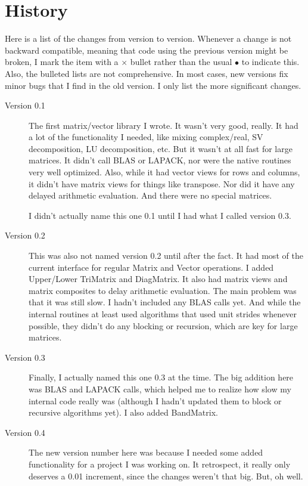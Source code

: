
\section{History}
\label{History}

Here is a list of the changes from version to version.  Whenever a change 
is not backward compatible, meaning that code using the previous version
might be broken, I mark the item with a $\times$ bullet rather than the usual $\bullet$
to indicate this.  
Also, the bulleted lists are not comprehensive.  
In most cases, new versions fix minor bugs that I find in the old version.  I only 
list the more significant changes.

\begin{description}
\item[Version 0.1]
The first matrix/vector library I wrote.  It wasn't very good, really. 
It had a lot of the functionality I needed, like mixing complex/real, 
SV decomposition, LU decomposition, etc.  But it wasn't at all fast for 
large matrices.  It didn't call BLAS or LAPACK, nor were the native routines
very well optimized.  Also, while it had vector views for rows and columns, 
it didn't have matrix views for things like transpose.  Nor did it have any
delayed arithmetic evaluation.  And there were no special matrices.

I didn't actually name this one 0.1 until I had what I called version 0.3.

\item[Version 0.2]
This was also not named version 0.2 until after the fact.  It had most of 
the current interface for regular Matrix and Vector operations.  I added
Upper/Lower TriMatrix and DiagMatrix.  It also had matrix views and
matrix composites to delay arithmetic evaluation.  The main problem was that
it was still slow.  I hadn't included any BLAS calls yet.  And while the 
internal routines at least used algorithms that used unit strides whenever 
possible, they didn't do any blocking or recursion, which are key for large
matrices.

\item[Version 0.3]
Finally, I actually named this one 0.3 at the time.
The big addition here was BLAS and LAPACK calls, which 
helped me to realize how slow my internal code really was (although I hadn't
updated them to block or recursive algorithms yet).
I also added BandMatrix.

\item[Version 0.4]
The new version number here was because I needed some added functionality for a
project I was working on.  It retrospect, it really only deserves a 0.01 increment,
since the changes weren't that big.  But, oh well.


\end{description}
